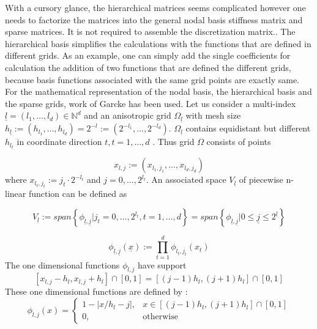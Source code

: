 With a cursory glance, the hierarchical matrices seems complicated however one needs to factorize the matrices into the general nodal basis stiffness matrix and sparse matrices. It is not required to assemble the discretization matrix.\cite{Yserentant1986}. The hierarchical basis simplifies the calculations with the functions that are defined in different grids. As an example, one can simply add the single coefficients for calculation the addition of two functions that are defined the different grids, because basis functions associated with the same grid points are exactly same\cite{Griebel1992b}.\\
For the mathematical representation of the nodal basis, the hierarchical basis and the sparse grids, work of Garcke \cite{Garcke2013} has been used. Let us consider a multi-index 
$\underline{l} = (l_{1}, \dots, l_{d}) \in \mathbb{N}^{d}$ 
and an anisotropic grid 
$\Omega_{\underline{l}}$
with mesh size
$h_{\underline{l}} := \left( h_{l_{1}}, \dots, h_{l_{d}}  \right) = 2^{-l} := \left( 2^{-l_{1}}, \dots, 2^{-l_{d}} \right)$.
$\Omega_{\underline{l}}$ contains equidistant but different $h_{l_{t}}$ in coordinate direction $t, t = 1,\dots,d$ . Thus grid $\Omega$ consists of points

\begin{equation}
    x_{l,j} := (x_{l_{1},j_{1}}, \dots ,x_{l_{d},j_{d}})
\end{equation}
where \( x_{l_{t},j_{t}} := j_{t}\cdot 2^{-l_{t}}\) and \( j = 0,\dots,2^{l_{t}} \). An associated space $V_{\underline{l}}$ of piecewise n-linear function can be defined as  

\begin{equation}
    V_{\underline{l}} := span\left\{\phi_{\underline{l},\underline{j}}| j_{t} = 0,\dots,2^{l_{t}} , t = 1,\dots,d \right\} = span\left\{\phi_{\underline{l},\underline{j}}| 0 \leq \underline{j} \leq 2^{\underline{l}} \right\}
\end{equation}

\begin{equation}
    \phi_{\underline{l},\underline{j}} ( \underline{x} ) := \prod\limits_{t=1}^d \phi_{l_{t},j_{t}}(x_{t})
\end{equation}
The one dimensional functions $\phi_{l,j}$ have support
\begin{equation}
    \left[ x_{l,j} - h_{l}, x_{l,j} + h_{l} \right] \cap [0,1] = \left[ (j-1)h_{l}, (j+1)h_{l} \right] \cap [0,1]
\end{equation}
These one dimensional functions are defined by :
\begin{equation}
     \phi_{l,j} (x) =
     \begin{cases}
     1 - \left|x/h_{l} - j \right|, &  x \in \left[ (j-1)h_{l}, (j+1)h_{l} \right] \cap [0,1] \\
     0, & \text{otherwise}
     \end{cases}
\end{equation}

